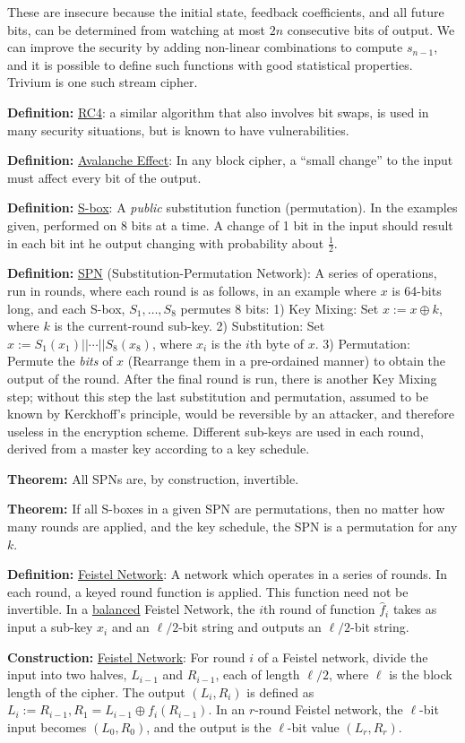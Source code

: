 \documentclass[10pt]{article}
\newcommand{\defn}[1]{{\bf Definition:} \underline{#1}}
\newcommand{\thm}[1]{{\bf Theorem:} \underline{#1}}
\newcommand{\con}[1]{{\bf Construction:} \underline{#1}}
\newcommand{\xor}{\oplus}
\begin{document}
\begin{multicols}{3}
These are insecure because the initial state, feedback coefficients, and all future bits, can be determined from watching at most $2n$ consecutive bits of output. We can improve the security by adding non-linear combinations to compute $s_{n-1}$, and it is possible to define such functions with good statistical properties. Trivium is one such stream cipher.

\defn{RC4}: a similar algorithm that also involves bit swaps, is used in many security situations, but is known to have vulnerabilities.

\defn{Avalanche Effect}: In any block cipher, a ``small change'' to the input must affect every bit of the output.

\defn{S-box}: A {\it public} substitution function (permutation). In the examples given, performed on $8$ bits at a time. A change of 1 bit in the input should result in each bit int he output changing with probability about $\frac{1}{2}$.

\defn{SPN} (Substitution-Permutation Network): A series of operations, run in rounds, where each round is as follows, in an example where $x$ is 64-bits long, and each S-box, $S_1,\dots,S_8$ permutes $8$ bits: 1) Key Mixing: Set $x:=x\xor k$, where $k$ is the current-round sub-key. 2) Substitution: Set $x:=S_1(x_1)||\cdots||S_8(x_8)$, where $x_i$ is the $i$th byte of $x$. 3) Permutation: Permute the {\it bits} of $x$ (Rearrange them in a pre-ordained manner) to obtain the output of the round. After the final round is run, there is another Key Mixing step; without this step the last substitution and permutation, assumed to be known by Kerckhoff's principle, would be reversible by an attacker, and therefore useless in the encryption scheme. Different sub-keys are used in each round, derived from a master key according to a key schedule.

\thm{}All SPNs are, by construction, invertible.

\thm{}If all S-boxes in a given SPN are permutations, then no matter how many rounds are applied, and the key schedule, the SPN is a permutation for any $k$.

\defn{Feistel Network}: A network which operates in a series of rounds. In each round, a keyed round function is applied. This function need not be invertible. In a \underline{balanced} Feistel Network, the $i$th round of function $\hat{f}_i$ takes as input a sub-key $x_i$ and an $\ell/2$-bit string and outputs an $\ell/2$-bit string.

\con{Feistel Network}: For round $i$ of a Feistel network, divide the input into two halves, $L_{i-1}$ and $R_{i-1}$, each of length $\ell/2$, where $\ell$ is the block length of the cipher. The output $(L_i,R_i)$ is defined as $L_i:=R_{i-1}, R_1=L_{i-1}\xor f_i(R_{i-1})$. In an $r$-round Feistel network, the $\ell$-bit input becomes $(L_0,R_0)$, and the output is the $\ell$-bit value $(L_r,R_r)$.


\end{multicols}
\end{document}
